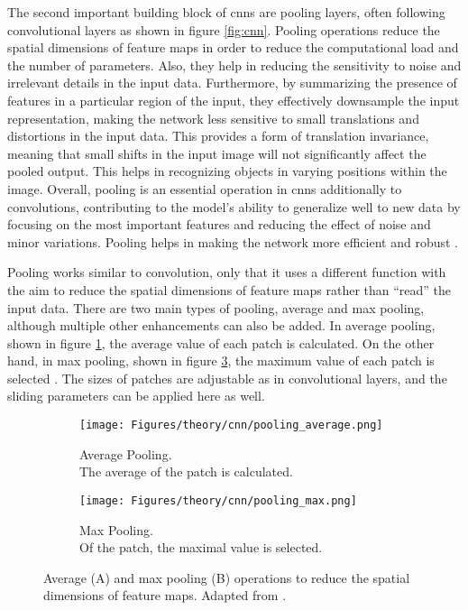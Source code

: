The second important building block of \glspl{cnn} are pooling layers, often following convolutional layers as shown in figure \ref{fig:cnn}. Pooling operations reduce the spatial dimensions of feature maps in order to reduce the computational load and the number of parameters. Also, they help in reducing the sensitivity to noise and irrelevant details in the input data. Furthermore, by summarizing the presence of features in a particular region of the input, they effectively downsample the input representation, making the network less sensitive to small translations and distortions in the input data. This provides a form of translation invariance, meaning that small shifts in the input image will not significantly affect the pooled output. This helps in recognizing objects in varying positions within the image. Overall, pooling is an essential operation in \glspl{cnn} additionally to convolutions, contributing to the model's ability to generalize well to new data by focusing on the most important features and reducing the effect of noise and minor variations. Pooling helps in making the network more efficient and robust \autocite{Gholamalinezhad.Khosravi2020,LeCun.Bengio.ea2015}.

Pooling works similar to convolution, only that it uses a different function with the aim to reduce the spatial dimensions of feature maps rather than \enquote{read} the input data. There are two main types of pooling, average and max pooling, although multiple other enhancements can also be added. In average pooling, shown in figure \ref{fig:average_pooling}, the average value of each patch is calculated. On the other hand, in max pooling, shown in figure \ref{fig:max_pooling}, the maximum value of each patch is selected \autocite{Dumoulin.Visin2018,Gholamalinezhad.Khosravi2020,LeCun.Bengio.ea2015}. The sizes of patches are adjustable as in convolutional layers, and the sliding parameters can be applied here as well.

\begin{figure}[htb]
    \centering
    \begin{subfigure}{.35\textwidth}
        \centering
        \texttt{[image: Figures/theory/cnn/pooling\_average.png]}
        \caption{Average Pooling.\\The average of the patch is calculated.}
        \label{fig:average_pooling}
    \end{subfigure}
    \begin{subfigure}{.35\textwidth}
        \centering
        \texttt{[image: Figures/theory/cnn/pooling\_max.png]}
        \caption{Max Pooling.\\Of the patch, the maximal value is selected.}
        \label{fig:max_pooling}
    \end{subfigure}
    \caption[Pooling Methods]{Average (A) and max pooling (B) operations to reduce the spatial dimensions of feature maps. Adapted from \textcite{Dumoulin.Visin2018}.}
\end{figure}

